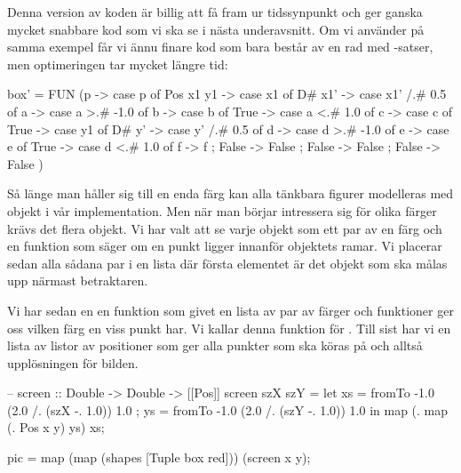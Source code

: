 \documentclass[Rapport]{subfiles}
\begin{document}
Denna version av koden är billig att få fram ur tidssynpunkt och ger ganska
mycket snabbare kod som vi ska se i nästa underavsnitt. Om vi använder 
 på samma exempel får vi ännu finare kod som bara består av en
rad med -satser, men optimeringen tar mycket längre tid:

\begin{codeEx}
box' = FUN (p -> case p of
   { Pos x1 y1 -> case x1 of
      { D# x1' -> case x1' /.# 0.5 of
         { a -> case a >.# -1.0 of
            { b -> case b of
               { True  -> case a <.# 1.0 of
                  { c -> case c of
                     { True  -> case y1 of
                        { D# y' -> case y' /.# 0.5 of
                           { d -> case d >.# -1.0 of
                              { e -> case e of
                                 { True  -> case d <.# 1.0 of
                                    { f -> f
                                    }
                                 ; False  -> False
                                 }
                              }
                           }
                        }
                     ; False  -> False
                     }
                  }
               ; False  -> False
               }
            }
         }
      }
   })
\end{codeEx}


Så länge man håller sig till en enda färg kan alla tänkbara figurer modelleras
med objekt i vår implementation. Men när man börjar intressera sig för olika färger krävs det
flera objekt. Vi har valt att se varje objekt som ett par
av en färg och en funktion som säger om en punkt ligger innanför objektets ramar. 
Vi placerar sedan alla sådana par i en lista där första elementet är det
objekt som ska målas upp närmast betraktaren. 

Vi har sedan en en funktion som givet en lista av par av färger och funktioner
ger oss vilken färg en viss punkt har. Vi kallar denna funktion för
. Till sist har vi en lista av listor av positioner som ger alla
punkter som  ska köras på och alltså upplösningen för bilden.

\begin{codeEx}

-- screen :: Double -> Double -> [[Pos]]
screen szX szY = let { xs = fromTo -1.0 (2.0 /. (szX -. 1.0)) 1.0
                     ; ys = fromTo -1.0 (2.0 /. (szY -. 1.0)) 1.0
                     }
                 in map (\x . map (\y . Pos x y) ys) xs;

pic = map (map (shapes [Tuple box red])) (screen x y);

\end{codeEx}
\end{document}
